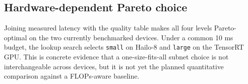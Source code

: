 \subsection{Hardware-dependent Pareto choice}
Joining measured latency with the quality table makes all four levels Pareto-optimal on the two currently benchmarked devices. Under a common 10 ms budget, the lookup search selects \texttt{small} on Hailo-8 and \texttt{large} on the TensorRT GPU. This is concrete evidence that a one-size-fits-all subnet choice is not interchangeable across devices, but it is not yet the planned quantitative comparison against a FLOPs-aware baseline.

